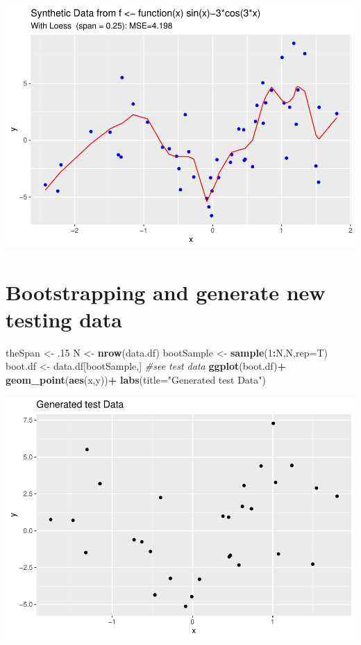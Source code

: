 \documentclass[]{article}
\newenvironment{Shaded}{\begin{snugshade}}{\end{snugshade}}
\newcommand{\CommentTok}[1]{\textcolor[rgb]{0.56,0.35,0.01}{\textit{#1}}}
\newcommand{\DataTypeTok}[1]{\textcolor[rgb]{0.13,0.29,0.53}{#1}}
\newcommand{\DecValTok}[1]{\textcolor[rgb]{0.00,0.00,0.81}{#1}}
\newcommand{\FloatTok}[1]{\textcolor[rgb]{0.00,0.00,0.81}{#1}}
\newcommand{\KeywordTok}[1]{\textcolor[rgb]{0.13,0.29,0.53}{\textbf{#1}}}
\newcommand{\NormalTok}[1]{#1}
\newcommand{\OperatorTok}[1]{\textcolor[rgb]{0.81,0.36,0.00}{\textbf{#1}}}
\newcommand{\StringTok}[1]{\textcolor[rgb]{0.31,0.60,0.02}{#1}}
\begin{document}
\includegraphics{Loess-MSE-via-Bootstrap_files/figure-latex/unnamed-chunk-6-1.pdf}

\hypertarget{bootstrapping-and-generate-new-testing-data}{%
\section{Bootstrapping and generate new testing
data}\label{bootstrapping-and-generate-new-testing-data}}

\begin{Shaded}
\begin{Highlighting}[]
\NormalTok{theSpan <-}\StringTok{ }\FloatTok{.15}
\NormalTok{N <-}\StringTok{ }\KeywordTok{nrow}\NormalTok{(data.df)}
\NormalTok{bootSample <-}\StringTok{ }\KeywordTok{sample}\NormalTok{(}\DecValTok{1}\OperatorTok{:}\NormalTok{N,N,}\DataTypeTok{rep=}\NormalTok{T)}
\NormalTok{boot.df <-}\StringTok{ }\NormalTok{data.df[bootSample,]}
\CommentTok{#see test data}
\KeywordTok{ggplot}\NormalTok{(boot.df)}\OperatorTok{+}
\StringTok{    }\KeywordTok{geom_point}\NormalTok{(}\KeywordTok{aes}\NormalTok{(x,y))}\OperatorTok{+}
\StringTok{  }\KeywordTok{labs}\NormalTok{(}\DataTypeTok{title=}\StringTok{"Generated test Data"}\NormalTok{)}
\end{Highlighting}
\end{Shaded}

\includegraphics{Loess-MSE-via-Bootstrap_files/figure-latex/unnamed-chunk-7-1.pdf}
\end{document}
